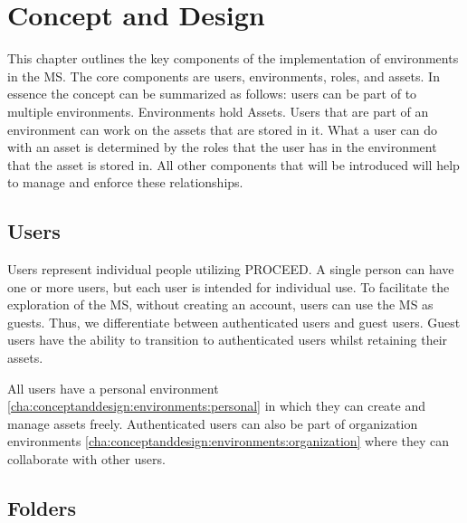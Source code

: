 \chapter{Concept and Design}
\label{cha:conceptanddesign}

This chapter outlines the key components of the implementation of environments in the MS.
The core components are users, environments, roles, and assets.
In essence the concept can be summarized as follows: users can be part of to multiple environments.
Environments hold Assets.
Users that are part of an environment can work on the assets that are stored in it.
What a user can do with an asset is determined by the roles that the user has in the
environment that the asset is stored in.
All other components that will be introduced will help to manage and enforce these relationships.

\section{Users}
\label{cha:conceptanddesign:users}

Users represent individual people utilizing PROCEED.
A single person can have one or more users, but each user is intended for individual use.
To facilitate the exploration of the MS, without creating an account, users
can use the MS as guests.
Thus, we differentiate between authenticated users and guest users.
Guest users have the ability to transition to authenticated users whilst retaining their assets.

All users have a personal environment \ref{cha:conceptanddesign:environments:personal}
in which they can create and manage assets freely.
Authenticated users can also be part of organization environments \ref{cha:conceptanddesign:environments:organization}
where they can collaborate with other users.


%

\section{Folders}

